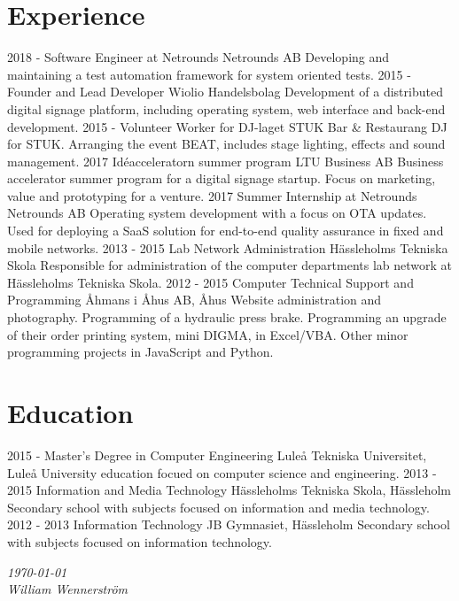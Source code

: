 \documentclass[]{friggeri-cv}
\begin{document}
\section{Experience}
\begin{entrylist}
    \entry
    {2018 -}
    {Software Engineer at Netrounds}
    {Netrounds AB}
    {Developing and maintaining a test automation framework for system oriented tests.}
    \entry
    {2015 -}
    {Founder and Lead Developer}
    {Wiolio Handelsbolag}
    {Development of a distributed digital signage platform, including operating system, web interface and back-end development.}
    \entry
    {2015 -}
    {Volunteer Worker for DJ-laget}
    {STUK Bar \& Restaurang}
    {DJ for STUK. Arranging the event BEAT, includes stage lighting, effects and sound management.}
    \entry
    {2017}
    {Idéacceleratorn summer program}
    {LTU Business AB}
    {Business accelerator summer program for a digital signage startup. Focus on marketing, value and prototyping for a venture.}
    \entry
    {2017}
    {Summer Internship at Netrounds}
    {Netrounds AB}
    {Operating system development with a focus on OTA updates. Used for deploying a SaaS solution for end-to-end quality assurance in fixed and mobile networks.}
    \entry
    {2013 - 2015}
    {Lab Network Administration}
    {Hässleholms Tekniska Skola}
    {Responsible for administration of the computer departments lab network at Hässleholms Tekniska Skola.}
    \entry
    {2012 - 2015}
    {Computer Technical Support and Programming}
    {Åhmans i Åhus AB, Åhus}
    {Website administration and photography. Programming of a hydraulic press brake. Programming an upgrade of their order printing system, mini DIGMA, in Excel/VBA. Other minor programming projects in JavaScript and Python.\\}
\end{entrylist}

\section{Education}
\begin{entrylist}
  \entry
    {2015 -}
    {Master's Degree in Computer Engineering}
    {Luleå Tekniska Universitet, Luleå}
    {University education focued on computer science and engineering.}
  \entry
    {2013 - 2015}
    {Information and Media Technology}
    {Hässleholms Tekniska Skola, Hässleholm}
    {Secondary school with subjects focused on information and media technology.}
  \entry
    {2012 - 2013}
    {Information Technology}
    {JB Gymnasiet, Hässleholm}
    {Secondary school with subjects focused on information technology.}
\end{entrylist}

\begin{flushright}
\emph{\today} \\
\emph{William Wennerström}
\end{flushright}
\end{document}
